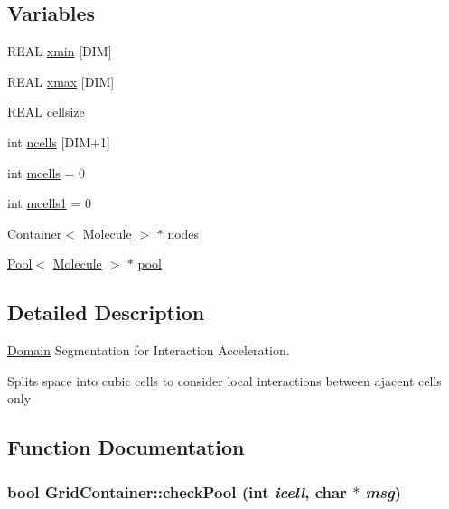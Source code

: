 \subsection*{Variables}
\begin{CompactItemize}
\item 
REAL \hyperlink{namespaceGridContainer_3add3b47160eb8fbc418f8ac3fd814ca}{xmin} \mbox{[}DIM\mbox{]}
\item 
REAL \hyperlink{namespaceGridContainer_9d067700316c122f755f39a295b26403}{xmax} \mbox{[}DIM\mbox{]}
\item 
REAL \hyperlink{namespaceGridContainer_bf30127e3b23c77aadb1ef337353b272}{cellsize}
\item 
int \hyperlink{namespaceGridContainer_c25718f4bfb7b8b8768a5c49233685a0}{ncells} \mbox{[}DIM+1\mbox{]}
\item 
int \hyperlink{namespaceGridContainer_90ecd8535be045b1958c270c13d67846}{mcells} = 0
\item 
int \hyperlink{namespaceGridContainer_a4e7210a39b907a414c0d77b750e291f}{mcells1} = 0
\item 
\hyperlink{classContainer}{Container}$<$ \hyperlink{classMolecule}{Molecule} $>$ $\ast$ \hyperlink{namespaceGridContainer_f133b78cfcbc65fd7a2aa94d8867cd60}{nodes}
\item 
\hyperlink{structPool}{Pool}$<$ \hyperlink{classMolecule}{Molecule} $>$ $\ast$ \hyperlink{namespaceGridContainer_27a1b54d99c94cfc62e5d3ab30ea42d6}{pool}
\end{CompactItemize}


\subsection{Detailed Description}
\hyperlink{classDomain}{Domain} Segmentation for Interaction Acceleration. 

Splits space into cubic cells to consider local interactions between ajacent cells only 



\subsection{Function Documentation}
\hypertarget{namespaceGridContainer_571ededa15fba6600603a030866dd2c5}{
\subsubsection[{checkPool}]{\setlength{\rightskip}{0pt plus 5cm}bool GridContainer::checkPool (int {\em icell}, \/  char $\ast$ {\em msg})}}
\label{namespaceGridContainer_571ededa15fba6600603a030866dd2c5}


